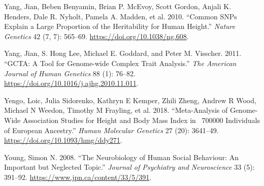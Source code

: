 \documentclass[
]{book}
\newlength{\cslhangindent}
\newlength{\cslentryspacingunit} %
\newenvironment{CSLReferences}[2] %
 {%
  \setlength{\parindent}{0pt}
  \ifodd #1
  \let\oldpar\par
  \def\par{\hangindent=\cslhangindent\oldpar}
  \fi
  \setlength{\parskip}{#2\cslentryspacingunit}
 }%
 {}
\begin{document}
\begin{CSLReferences}{1}{0}
\leavevmode{}%
Yang, Jian, Beben Benyamin, Brian P. McEvoy, Scott Gordon, Anjali K. Henders, Dale R. Nyholt, Pamela A. Madden, et al. 2010. {``Common {SNPs} Explain a Large Proportion of the Heritability for Human Height.''} \emph{Nature Genetics} 42 (7, 7): 565--69. \url{https://doi.org/10.1038/ng.608}.

\leavevmode{}%
Yang, Jian, S. Hong Lee, Michael E. Goddard, and Peter M. Visscher. 2011. {``{GCTA}: {A Tool} for {Genome-wide Complex Trait Analysis}.''} \emph{The American Journal of Human Genetics} 88 (1): 76--82. \url{https://doi.org/10.1016/j.ajhg.2010.11.011}.

\leavevmode{}%
Yengo, Loic, Julia Sidorenko, Kathryn E Kemper, Zhili Zheng, Andrew R Wood, Michael N Weedon, Timothy M Frayling, et al. 2018. {``Meta-Analysis of Genome-Wide Association Studies for Height and Body Mass Index in ~700000 Individuals of {European} Ancestry.''} \emph{Human Molecular Genetics} 27 (20): 3641--49. \url{https://doi.org/10.1093/hmg/ddy271}.

\leavevmode{}%
Young, Simon N. 2008. {``The Neurobiology of Human Social Behaviour: An Important but Neglected Topic.''} \emph{Journal of Psychiatry and Neuroscience} 33 (5): 391--92. \url{https://www.jpn.ca/content/33/5/391}.

\end{CSLReferences}
\end{document}
